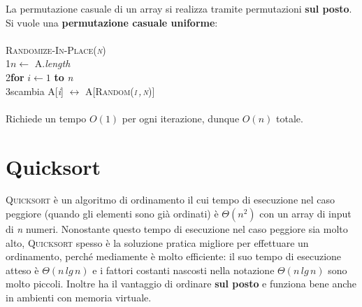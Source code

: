 \documentclass[10pt, a4paper]{report}
\newcommand\firsttab[1][0.5cm]{\hspace*{#1}}
\newcommand\secondtab[1][1cm]{\hspace*{#1}}
\begin{document}
La permutazione casuale di un array si realizza tramite permutazioni \textbf{sul posto}. Si vuole una \textbf{permutazione casuale uniforme}:\\\\
\textsc{Randomize-In-Place(\textit{n})}\\
1\firsttab$n \leftarrow$ A.\textit{length}\\
2\firsttab\textbf{for} $i \leftarrow 1$ \textbf{to} \textit{n}\\
3\secondtab scambia A[\textit{i}] $\leftrightarrow$ A[\textsc{Random(\textit{i\,,\,n})}]\\\\
Richiede un tempo $O(1)$ per ogni iterazione, dunque $O(n)$ totale.
\chapter{Quicksort}
\textsc{Quicksort} è un algoritmo di ordinamento il cui tempo di esecuzione nel caso peggiore (quando gli elementi sono già ordinati) è $\Theta(n^2)$ con un array di input di \textit{n} numeri. Nonostante questo tempo di esecuzione nel caso peggiore sia molto alto, \textsc{Quicksort} spesso è la soluzione pratica migliore per effettuare un ordinamento, perché mediamente è molto efficiente: il suo tempo di esecuzione atteso è $\Theta(n\,lg\,n)$ e i fattori costanti nascosti nella notazione $\Theta(n\,lg\,n)$ sono molto piccoli. Inoltre ha il vantaggio di ordinare \textbf{sul posto} e funziona bene anche in ambienti con memoria virtuale. 
\end{document}
